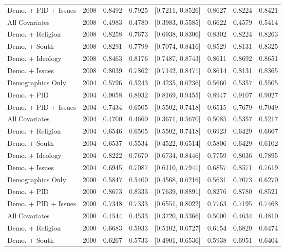 \begin{longtable}{lrrrlrrr}
  Demo. + PID + Issues & 2008 & 0.8492 & 0.7925 & [0.7211, 0.8526] & 0.8627 & 0.8224 & 0.8421 \\ 
  All Covariates & 2008 & 0.4983 & 0.4780 & [0.3983, 0.5585] & 0.6622 & 0.4579 & 0.5414 \\ 
  Demo. + Religion & 2008 & 0.8258 & 0.7673 & [0.6938, 0.8306] & 0.8302 & 0.8224 & 0.8263 \\ 
  Demo. + South & 2008 & 0.8291 & 0.7799 & [0.7074, 0.8416] & 0.8529 & 0.8131 & 0.8325 \\ 
  Demo. + Ideology & 2008 & 0.8463 & 0.8176 & [0.7487, 0.8743] & 0.8611 & 0.8692 & 0.8651 \\ 
  Demo. + Issues & 2008 & 0.8039 & 0.7862 & [0.7142, 0.8471] & 0.8614 & 0.8131 & 0.8365 \\ 
  Demographics Only & 2004 & 0.5796 & 0.5243 & [0.4235, 0.6236] & 0.5660 & 0.5357 & 0.5505 \\ 
  Demo. + PID & 2004 & 0.9058 & 0.8932 & [0.8169, 0.9455] & 0.8947 & 0.9107 & 0.9027 \\ 
  Demo. + PID + Issues & 2004 & 0.7434 & 0.6505 & [0.5502, 0.7418] & 0.6515 & 0.7679 & 0.7049 \\ 
  All Covariates & 2004 & 0.4700 & 0.4660 & [0.3671, 0.5670] & 0.5085 & 0.5357 & 0.5217 \\ 
  Demo. + Religion & 2004 & 0.6546 & 0.6505 & [0.5502, 0.7418] & 0.6923 & 0.6429 & 0.6667 \\ 
  Demo. + South & 2004 & 0.6537 & 0.5534 & [0.4522, 0.6514] & 0.5806 & 0.6429 & 0.6102 \\ 
  Demo. + Ideology & 2004 & 0.8222 & 0.7670 & [0.6734, 0.8446] & 0.7759 & 0.8036 & 0.7895 \\ 
  Demo. + Issues & 2004 & 0.6945 & 0.7087 & [0.6110, 0.7941] & 0.6857 & 0.8571 & 0.7619 \\ 
  Demographics Only & 2000 & 0.5847 & 0.5400 & [0.4568, 0.6216] & 0.5631 & 0.7073 & 0.6270 \\ 
  Demo. + PID & 2000 & 0.8673 & 0.8333 & [0.7639, 0.8891] & 0.8276 & 0.8780 & 0.8521 \\ 
  Demo. + PID + Issues & 2000 & 0.7348 & 0.7333 & [0.6551, 0.8022] & 0.7763 & 0.7195 & 0.7468 \\ 
  All Covariates & 2000 & 0.4544 & 0.4533 & [0.3720, 0.5366] & 0.5000 & 0.4634 & 0.4810 \\ 
  Demo. + Religion & 2000 & 0.6683 & 0.5933 & [0.5102, 0.6727] & 0.6154 & 0.6829 & 0.6474 \\ 
  Demo. + South & 2000 & 0.6267 & 0.5733 & [0.4901, 0.6536] & 0.5938 & 0.6951 & 0.6404 \\ 

\end{longtable}
